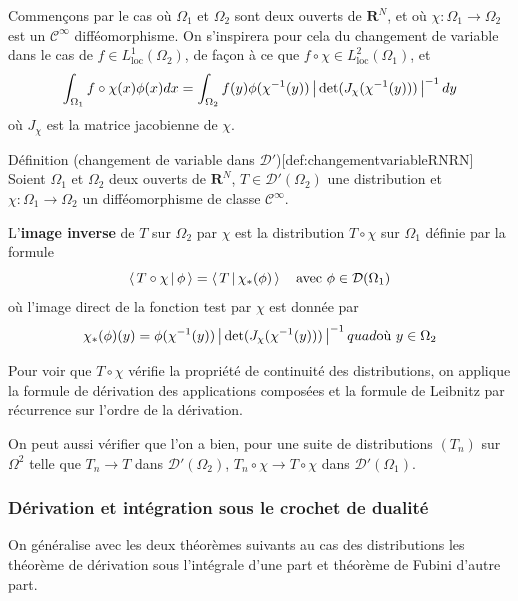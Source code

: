         Commençons par le cas où $\Omega_1$ et $\Omega_2$ sont deux ouverts de $\mathbf{R}^N$, et où $\chi : \Omega_1 \to \Omega_2$ est un $\mathcal{C}^{\infty}$ difféomorphisme. On s’inspirera pour cela du changement de variable dans le cas de $f \in L^1_{\text{loc}}(\Omega_2)$, de façon à ce que $f \circ \chi \in L^2_{\text{loc}}(\Omega_1)$, et 
        \[ \int_{\Omega_1} f \circ \chi(x) \phi(x) dx = \int_{\Omega_2} f(y) \phi(\chi^{-1}(y)) \left\lvert \, \det(J_{\chi}(\chi^{-1}(y))) \, \right\rvert^{-1} dy \]   
        où $J_\chi$ est la matrice jacobienne de $\chi$. 

        \begin{omed}{Définition (changement de variable dans $\mathcal{D}'$)}[def:changementvariableRNRN]
            Soient $\Omega_1$ et $\Omega_2$ deux ouverts de $\mathbf{R}^N$, $T \in \mathcal{D}'(\Omega_2)$ une distribution et $\chi : \Omega_1 \to \Omega_2$ un difféomorphisme de classe $\mathcal{C}^{\infty}$. 

            L'\textbf{image inverse} de $T$ sur $\Omega_2$ par $\chi$ est la distribution $T \circ \chi$ sur $\Omega_1$ définie par la formule 
            \[ \left< \, T \circ \chi \, \middle| \, \phi \, \right> = \left< \, T \, \middle| \, \chi_*(\phi) \, \right> \quad \text{avec } \phi \in \mathcal{D}(\Omega_1) \]   
            où l’image direct de la fonction test par $\chi$ est donnée par 
            \[ \chi_*(\phi)(y) = \phi(\chi^{-1}(y)) \left\lvert \, \det(J_{\chi}(\chi^{-1}(y))) \, \right\rvert^{-1} quad \text{où } y \in \Omega_2 \]
        \end{omed}

        Pour voir que $T \circ \chi$ vérifie la propriété de continuité des distributions, on applique la formule de dérivation des applications composées et la formule de Leibnitz par récurrence sur l’ordre de la dérivation.

        On peut aussi vérifier que l’on a bien, pour une suite de distributions $(T_n)$ sur $\Omega^2$ telle que $T_n \to T$ dans $\mathcal{D}'(\Omega_2)$, $T_n \circ \chi \to T \circ \chi$ dans $\mathcal{D}'(\Omega_1)$.

        \subsubsection{Dérivation et intégration sous le crochet de dualité}

        On généralise avec les deux théorèmes suivants au cas des distributions les théorème de dérivation sous l’intégrale d’une part et théorème de Fubini d’autre part.

